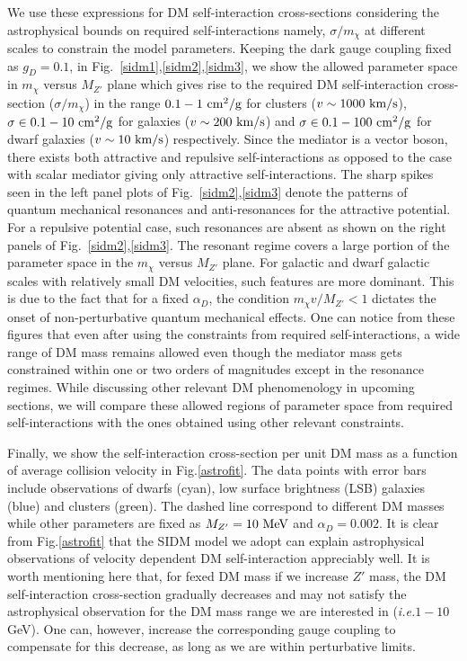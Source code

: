 \documentclass[prd,nofootinbib,preprint,superscriptaddress]{revtex4}
\begin{document}
		We use these expressions for DM self-interaction cross-sections considering the astrophysical bounds on required self-interactions namely, $\sigma/m_\chi$ at different scales to constrain the model parameters. Keeping the dark gauge coupling fixed as $g_D=0.1$, in Fig.~\ref{sidm1},\ref{sidm2},\ref{sidm3}, we show the allowed parameter space in $m_\chi$ versus $M_{Z'}$ plane which gives rise to the required DM self-interaction cross-section ($\sigma/m_\chi$) in the range $0.1-1~{\rm cm}^2/{\rm g}$ for clusters ($v\sim1000~ \rm km/s$), $\sigma \in 0.1-10~{\rm cm}^2/{\rm g}$ for galaxies ($v\sim 200~ \rm km/s$) and $\sigma \in 0.1-100~{\rm cm}^2/{\rm g}$ for dwarf galaxies ($v\sim 10~ \rm km/s$) respectively. Since the mediator is a vector boson, there exists both attractive and repulsive self-interactions as opposed to the case with scalar mediator giving only attractive self-interactions. The sharp spikes seen in the left panel plots of Fig.~\ref{sidm2},\ref{sidm3} denote the patterns of quantum mechanical resonances and anti-resonances for the attractive potential. For a repulsive potential case, such resonances are absent as shown on the right panels of Fig.~\ref{sidm2},\ref{sidm3}. The resonant regime covers a large portion of the parameter space in the $m_\chi$ versus $M_{Z'}$ plane. For galactic and dwarf galactic scales with relatively small DM velocities, such features are more dominant. This is due to the fact that for a fixed $\alpha_D$, the condition $m_{\chi} v/M_{Z'} < 1$ dictates the onset of non-perturbative quantum mechanical effects. One can notice from these figures that even after using the constraints from required self-interactions, a wide range of DM mass remains allowed even though the mediator mass gets constrained within one or two orders of magnitudes except in the resonance regimes. While discussing other relevant DM phenomenology in upcoming sections, we will compare these allowed regions of parameter space from required self-interactions with the ones obtained using other relevant constraints.
		
		
		Finally, we show the self-interaction cross-section per unit DM mass as a function of average collision velocity in Fig.\ref{astrofit}. The data points with error bars include observations of dwarfs (cyan), low surface brightness (LSB) galaxies (blue) and clusters (green)\cite{Kaplinghat:2015aga,Kamada:2020buc}. The dashed line correspond to different DM masses while other parameters are fixed as $M_{Z'}=10~\rm MeV$ and $\alpha_D = 0.002$. It is clear from Fig.\ref{astrofit} that the SIDM model we adopt can explain astrophysical observations of velocity dependent DM self-interaction appreciably well. It is worth mentioning here that, for fexed DM mass if we increase $Z'$ mass, the DM self-interaction cross-section gradually decreases and may not satisfy the astrophysical observation for the DM mass range we are interested in ({\it i.e.}$1-10$ GeV). One can, however, increase the corresponding gauge coupling to compensate for this decrease, as long as we are within perturbative limits.
		
\end{document}
